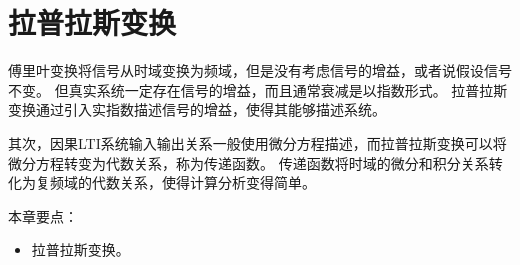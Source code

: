 \chapter{拉普拉斯变换}

傅里叶变换将信号从时域变换为频域，但是没有考虑信号的增益，或者说假设信号不变。
但真实系统一定存在信号的增益，而且通常衰减是以指数形式。
拉普拉斯变换通过引入实指数描述信号的增益，使得其能够描述系统。

其次，因果LTI系统输入输出关系一般使用微分方程描述，而拉普拉斯变换可以将微分方程转变为代数关系，称为传递函数。
传递函数将时域的微分和积分关系转化为复频域的代数关系，使得计算分析变得简单。

本章要点：
\begin{itemize}
    \item 拉普拉斯变换。
\end{itemize}

\newpage


\newpage


\newpage


\newpage





